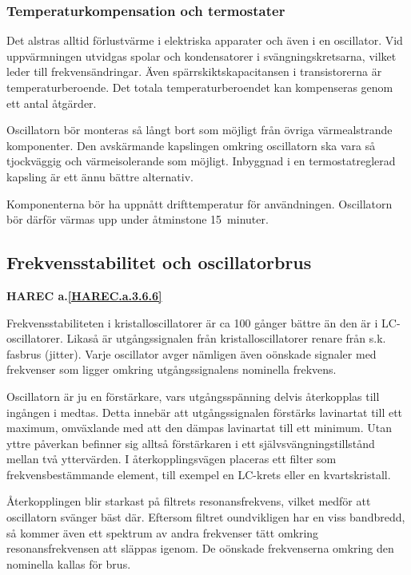 \subsubsection{Temperaturkompensation och termostater}

Det alstras alltid förlustvärme i elektriska apparater och även i en
oscillator.
Vid uppvärmningen utvidgas spolar och kondensatorer i svängningskretsarna,
vilket leder till frekvensändringar.
Även spärrskiktskapacitansen i transistorerna är temperaturberoende.
Det totala temperaturberoendet kan kompenseras genom ett antal åtgärder.

Oscillatorn bör monteras så långt bort som möjligt från övriga
värmealstrande komponenter.
Den avskärmande kapslingen omkring oscillatorn ska vara så tjockväggig och
värmeisolerande som möjligt.
Inbyggnad i en termostatreglerad kapsling är ett ännu bättre alternativ.

Komponenterna bör ha uppnått drifttemperatur för användningen.
Oscillatorn bör därför värmas upp under åtminstone 15~minuter.

\subsection{Frekvensstabilitet och oscillatorbrus}
\textbf{HAREC a.\ref{HAREC.a.3.6.6}\label{myHAREC.a.3.6.6}}

Frekvensstabiliteten i kristalloscillatorer är ca 100 gånger bättre än
den är i LC-oscillatorer.
Likaså är utgångssignalen från kristalloscillatorer renare från s.k. fasbrus
(jitter).
Varje oscillator avger nämligen även oönskade signaler med frekvenser som
ligger omkring utgångssignalens nominella frekvens.

Oscillatorn är ju en förstärkare, vars utgångsspänning delvis
återkopplas till ingången i medtas.
Detta innebär att utgångssignalen förstärks lavinartat till ett maximum,
omväxlande med att den dämpas lavinartat till ett minimum.
Utan yttre påverkan befinner sig alltså förstärkaren i ett
självsvängningstillstånd mellan två yttervärden.
I återkopplingsvägen placeras ett filter som frekvensbestämmande
element, till exempel en LC-krets eller en kvartskristall.

Återkopplingen blir starkast på filtrets resonansfrekvens, vilket
medför att oscillatorn svänger bäst där.
Eftersom filtret oundvikligen har en viss bandbredd, så kommer även ett
spektrum av andra frekvenser tätt omkring resonansfrekvensen att släppas
igenom.
De oönskade frekvenserna omkring den nominella kallas för brus.

